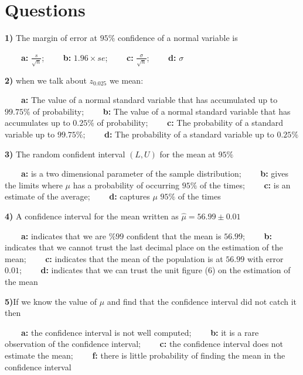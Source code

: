 \documentclass[
]{book}
\begin{document}
\hypertarget{questions-10}{%
\section{Questions}\label{questions-10}}

\textbf{1)} The margin of error at \(95\%\) confidence of a normal variable is

\textbf{\(\qquad\)a:} \(\frac{s}{\sqrt{n}}\);
\textbf{\(\qquad\)b:} \(1.96\times se\);
\textbf{\(\qquad\)c:} \(\frac{\sigma}{\sqrt{n}}\);
\textbf{\(\qquad\)d:} \(\sigma\)

\textbf{2)} when we talk about \(z_{0.025}\) we mean:

\textbf{\(\qquad\)a:} The value of a normal standard variable that has accumulated up to \(99.75\%\) of probability;
\textbf{\(\qquad\)b:} The value of a normal standard variable that has accumulates up to \(0.25\%\) of probability;
\textbf{\(\qquad\)c:} The probability of a standard variable up to \(99.75\%\);
\textbf{\(\qquad\)d:} The probability of a standard variable up to \(0.25\%\)

\textbf{3)} The random confident interval \((L,U)\) for the mean at \(95\%\)

\textbf{\(\qquad\)a:} is a two dimensional parameter of the sample distribution;
\textbf{\(\qquad\)b:} gives the limits where \(\mu\) has a probability of occurring \(95\%\) of the times;
\textbf{\(\qquad\)c:} is an estimate of the average;
\textbf{\(\qquad\)d:} captures \(\mu\) \(95\%\) of the times

\textbf{4)} A confidence interval for the mean written as \(\hat{\mu}=56.99 \pm 0.01\)

\textbf{\(\qquad\)a:} indicates that we are \(\%99\) confident that the mean is \(56.99\);
\textbf{\(\qquad\)b:} indicates that we cannot trust the last decimal place on the estimation of the mean;
\textbf{\(\qquad\)c:} indicates that the mean of the population is at \(56.99\) with error \(0.01\);
\textbf{\(\qquad\)d:} indicates that we can trust the unit figure (\(6\)) on the estimation of the mean

\textbf{5)}If we know the value of \(\mu\) and find that the confidence interval did not catch it then

\textbf{\(\qquad\)a:} the confidence interval is not well computed;
\textbf{\(\qquad\)b:} it is a rare observation of the confidence interval;
\textbf{\(\qquad\)c:} the confidence interval does not estimate the mean;
\textbf{\(\qquad\)f:} there is little probability of finding the mean in the confidence interval
\end{document}
